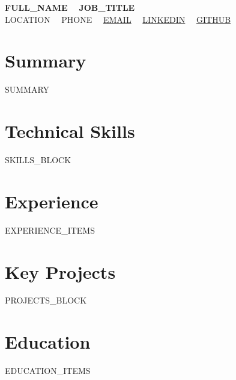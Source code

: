 \documentclass[9pt,letterpaper]{article}
\begin{document}
\begin{center}
  {\Large \textbf{{{FULL_NAME}}}} \ \textbar \ \textbf{{{JOB_TITLE}}} \\[2pt]
  \footnotesize
  {{LOCATION}} \ \textbullet \ 
  {{PHONE}} \ \textbullet \ 
  \href{mailto:{{EMAIL}}}{{{EMAIL}}} \ \textbullet \ 
  \href{https://{{LINKEDIN}}}{{{LINKEDIN}}} \ \textbullet \ 
  \href{https://{{GITHUB}}}{{{GITHUB}}}
\end{center}

\vspace{-6pt}

\section{Summary}
\footnotesize
{{SUMMARY}}

\section{Technical Skills}
\footnotesize
{{SKILLS_BLOCK}}

\section{Experience}
\footnotesize
{{EXPERIENCE_ITEMS}}

\section{Key Projects}
\footnotesize
{{PROJECTS_BLOCK}}

\section{Education}
\footnotesize
{{EDUCATION_ITEMS}}
\end{document}
